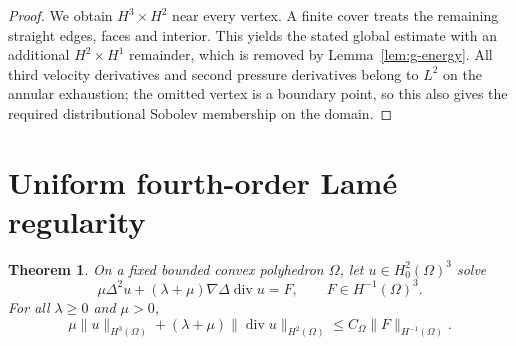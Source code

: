 \documentclass[11pt,a4paper]{article}
\newtheorem{theorem}{Theorem}[section]
\theoremstyle{remark}
\numberwithin{equation}{section}
\begin{document}
\begin{proof}
We obtain $H^3\times H^2$ near every vertex. A finite cover treats the
remaining straight edges, faces and interior. This yields the stated global
estimate with an additional $H^2\times H^1$ remainder, which is removed by
Lemma~\ref{lem:g-energy}. All third velocity derivatives and second pressure
derivatives belong to $L^2$ on the annular exhaustion; the omitted vertex is
a boundary point, so this also gives the required distributional Sobolev
membership on the domain.
\end{proof}

\section{Uniform fourth-order Lam\'e regularity}
\label{sec:g-lameuniform}

\begin{theorem}\label{thm:g-lameuniform}
On a fixed bounded convex polyhedron $\Omega$, let $u\in H^2_0(\Omega)^3$
solve
\[
 \mu\Delta^2u+(\lambda+\mu)\nabla\Delta\operatorname{div}u=F,
 \qquad F\in H^{-1}(\Omega)^3.
\]
For all $\lambda\ge0$ and $\mu>0$,
\[
 \mu\|u\|_{H^3(\Omega)}
 +(\lambda+\mu)\|\operatorname{div}u\|_{H^2(\Omega)}
 \le C_\Omega\|F\|_{H^{-1}(\Omega)}.
\]
\end{theorem}
\end{document}
